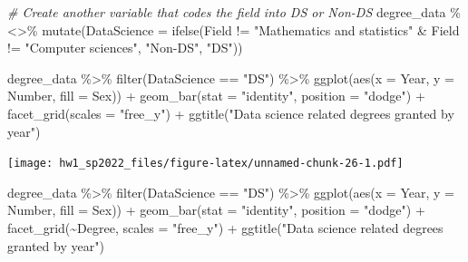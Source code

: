 \documentclass[
]{article}
\newenvironment{Shaded}{\begin{snugshade}}{\end{snugshade}}
\newcommand{\AttributeTok}[1]{\textcolor[rgb]{0.77,0.63,0.00}{#1}}
\newcommand{\CommentTok}[1]{\textcolor[rgb]{0.56,0.35,0.01}{\textit{#1}}}
\newcommand{\FunctionTok}[1]{\textcolor[rgb]{0.00,0.00,0.00}{#1}}
\newcommand{\NormalTok}[1]{#1}
\newcommand{\SpecialCharTok}[1]{\textcolor[rgb]{0.00,0.00,0.00}{#1}}
\newcommand{\StringTok}[1]{\textcolor[rgb]{0.31,0.60,0.02}{#1}}
\begin{document}
\begin{Shaded}
\begin{Highlighting}[]
\CommentTok{\# Create another variable that codes the field into DS or Non{-}DS}
\NormalTok{degree\_data }\SpecialCharTok{\%\textless{}\textgreater{}\%} \FunctionTok{mutate}\NormalTok{(}\AttributeTok{DataScience =} \FunctionTok{ifelse}\NormalTok{(Field }\SpecialCharTok{!=} \StringTok{"Mathematics and statistics"} \SpecialCharTok{\&}\NormalTok{ Field }\SpecialCharTok{!=} \StringTok{"Computer sciences"}\NormalTok{, }\StringTok{"Non{-}DS"}\NormalTok{, }\StringTok{"DS"}\NormalTok{))}

\NormalTok{degree\_data }\SpecialCharTok{\%\textgreater{}\%}
  \FunctionTok{filter}\NormalTok{(DataScience }\SpecialCharTok{==} \StringTok{"DS"}\NormalTok{) }\SpecialCharTok{\%\textgreater{}\%}
  \FunctionTok{ggplot}\NormalTok{(}\FunctionTok{aes}\NormalTok{(}\AttributeTok{x =}\NormalTok{ Year, }\AttributeTok{y =}\NormalTok{ Number, }\AttributeTok{fill =}\NormalTok{ Sex)) }\SpecialCharTok{+}
  \FunctionTok{geom\_bar}\NormalTok{(}\AttributeTok{stat =} \StringTok{"identity"}\NormalTok{, }\AttributeTok{position =} \StringTok{"dodge"}\NormalTok{) }\SpecialCharTok{+}
  \FunctionTok{facet\_grid}\NormalTok{(}\AttributeTok{scales =} \StringTok{"free\_y"}\NormalTok{) }\SpecialCharTok{+}
  \FunctionTok{ggtitle}\NormalTok{(}\StringTok{"Data science related degrees granted by year"}\NormalTok{)}
\end{Highlighting}
\end{Shaded}

\texttt{[image: hw1\_sp2022\_files/figure-latex/unnamed-chunk-26-1.pdf]}

\begin{Shaded}
\begin{Highlighting}[]
\NormalTok{degree\_data }\SpecialCharTok{\%\textgreater{}\%}
  \FunctionTok{filter}\NormalTok{(DataScience }\SpecialCharTok{==} \StringTok{"DS"}\NormalTok{) }\SpecialCharTok{\%\textgreater{}\%}
  \FunctionTok{ggplot}\NormalTok{(}\FunctionTok{aes}\NormalTok{(}\AttributeTok{x =}\NormalTok{ Year, }\AttributeTok{y =}\NormalTok{ Number, }\AttributeTok{fill =}\NormalTok{ Sex)) }\SpecialCharTok{+}
  \FunctionTok{geom\_bar}\NormalTok{(}\AttributeTok{stat =} \StringTok{"identity"}\NormalTok{, }\AttributeTok{position =} \StringTok{"dodge"}\NormalTok{) }\SpecialCharTok{+}
  \FunctionTok{facet\_grid}\NormalTok{(}\SpecialCharTok{\textasciitilde{}}\NormalTok{Degree, }\AttributeTok{scales =} \StringTok{"free\_y"}\NormalTok{) }\SpecialCharTok{+}
  \FunctionTok{ggtitle}\NormalTok{(}\StringTok{"Data science related degrees granted by year"}\NormalTok{)}
\end{Highlighting}
\end{Shaded}
\end{document}
